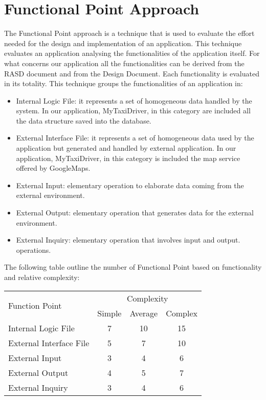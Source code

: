 \section{Functional Point Approach}
The Functional Point approach is a technique that is used to evaluate the effort
needed for the design and implementation of an application.
This technique evaluates an application analysing the functionalities of the application itself.
For what concerns our application all the functionalities can be derived from the RASD document and from
the Design Document. Each functionality is evaluated in its totality.
This technique groups the functionalities of an application in:
\begin{itemize}
  \item Internal Logic File: it represents a set of homogeneous data handled
by the system. In our application, MyTaxiDriver, in this category are included all the
data structure saved into the database.
 \item External Interface File: it represents a set of homogeneous data used
by the application but generated and handled by external application. In our application, MyTaxiDriver,
in this category is included the map service offered by GoogleMaps.
 \item External Input: elementary operation to elaborate data coming from the external environment.
 \item External Output: elementary operation that generates data for the external environment.
 \item External Inquiry: elementary operation that involves input and output.
operations.
\end{itemize}
The following table outline the number of Functional Point based on functionality
and relative complexity:
\begin{center}
\begin{tabular} { | l | c | c | c | } \hline
  \multirow{2}{*}{Function Point} & \multicolumn{3}{|c|}{Complexity} \\ \cline{2-4}  
  & Simple & Average & Complex \\ \hline 
  Internal Logic File & 7 & 10 & 15 \\ \hline
  External Interface File & 5 & 7 & 10 \\ \hline
  External Input & 3 & 4 & 6 \\ \hline
  External Output & 4 & 5 & 7 \\ \hline
  External Inquiry & 3 & 4 & 6 \\ \hline
\end{tabular}
\end{center}

